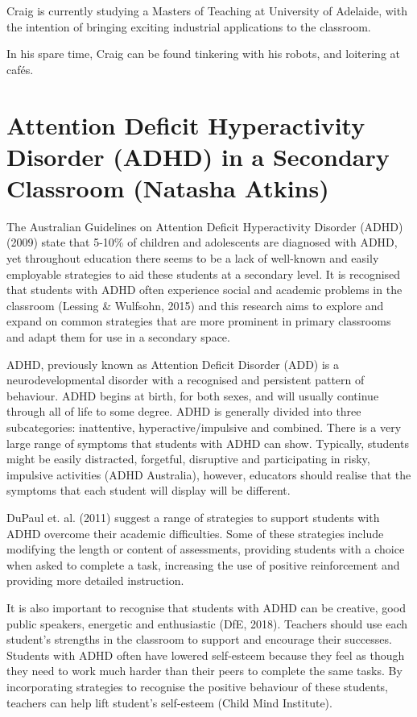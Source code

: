 \documentclass[twoside,14pt,a4paper,notitlepage]{memoir}
\begin{document}
Craig is currently studying a Masters of Teaching at University of Adelaide, with the intention of bringing exciting industrial applications to the classroom.

In his spare time, Craig can be found tinkering with his robots, and loitering at cafés.



\section*{Attention Deficit Hyperactivity Disorder (ADHD) in a Secondary Classroom (Natasha Atkins)}
\label{aut:atkins}

The Australian Guidelines on Attention Deficit Hyperactivity Disorder (ADHD) (2009) state that 5-10\% of children and adolescents are diagnosed with ADHD, yet throughout education there seems to be a lack of well-known and easily employable strategies to aid these students at a secondary level. It is recognised that students with ADHD often experience social and academic problems in the classroom (Lessing \& Wulfsohn, 2015) and this research aims to explore and expand on common strategies that are more prominent in primary classrooms and adapt them for use in a secondary space.

ADHD, previously known as Attention Deficit Disorder (ADD) is a neurodevelopmental disorder with a recognised and persistent pattern of behaviour. ADHD begins at birth, for both sexes, and will usually continue through all of life to some degree. ADHD is generally divided into three subcategories: inattentive, hyperactive/impulsive and combined. There is a very large range of symptoms that students with ADHD can show. Typically, students might be easily distracted, forgetful, disruptive and participating in risky, impulsive activities (ADHD Australia), however, educators should realise that the symptoms that each student will display will be different.

DuPaul et. al. (2011) suggest a range of strategies to support students with ADHD overcome their academic difficulties. Some of these strategies include modifying the length or content of assessments, providing students with a choice when asked to complete a task, increasing the use of positive reinforcement and providing more detailed instruction.

It is also important to recognise that students with ADHD can be creative, good public speakers, energetic and enthusiastic (DfE, 2018). Teachers should use each student’s strengths in the classroom to support and encourage their successes. Students with ADHD often have lowered self-esteem because they feel as though they need to work much harder than their peers to complete the same tasks. By incorporating strategies to recognise the positive behaviour of these students, teachers can help lift student’s self-esteem (Child Mind Institute).
\end{document}
